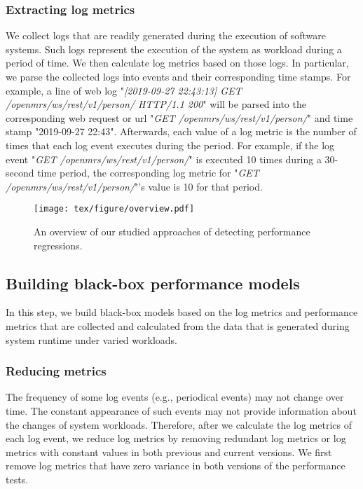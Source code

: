 \subsubsection{Extracting log metrics}

We collect logs that are readily generated during the execution of software systems. Such logs represent the execution of the system as workload during a period of time. We then calculate log metrics based on those logs. In particular, we parse the collected logs into events and their corresponding time stamps. For example, a line of web log "\emph{[2019-09-27 22:43:13] GET /openmrs/ws/rest/v1/person/ HTTP/1.1 200}" will be parsed into the corresponding web request or url "\emph{GET /openmrs/ws/rest/v1/person/}" and time stamp "2019-09-27 22:43". Afterwards, each value of a log metric is the number of times that each log event executes during the period. For example, if the log event "\emph{GET /openmrs/ws/rest/v1/person/}" is executed 10 times during a 30-second time period, the corresponding log metric for "\emph{GET /openmrs/ws/rest/v1/person/}"’s value is 10 for that period. 


\begin{figure*}[tbh]
  \centering
  \texttt{[image: tex/figure/overview.pdf]}
  \caption{An overview of our studied approaches of detecting performance regressions.}
  
  \label{fig:overview}
\end{figure*}



\subsection{Building black-box performance models}
\label{sec:buildmodel}
In this step, we build black-box models based on the log metrics and performance metrics that are collected and calculated from the data that is generated during system runtime under varied workloads. 

\subsubsection{Reducing metrics}
The frequency of some log events (e.g., periodical events) may not change over time.
The constant appearance of such events may not provide information about the changes of system workloads.
Therefore, after we calculate the log metrics of each log event, we reduce log metrics by removing redundant log metrics or log metrics with constant values in both previous and current versions. We first remove log metrics that have zero variance in both versions of the performance tests. 

